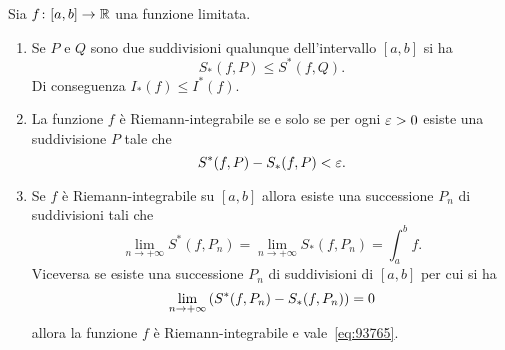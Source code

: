 \begin{theorem}
\label{th:criteri_integrabilita}
\mymark{*}
Sia $f\colon[a,b]\to \mathbb R$ una funzione limitata.
\begin{enumerate}
\item
Se $P$ e $Q$ sono due suddivisioni qualunque dell'intervallo
$[a,b]$ si ha
\[
  S_*(f,P) \le S^*(f,Q).
\]
Di conseguenza $I_*(f) \le I^*(f)$.

\item
La funzione $f$ è Riemann-integrabile se e solo se
per ogni $\varepsilon>0$ esiste una suddivisione $P$
tale che
\[
  S^*(f,P) - S_*(f,P) < \varepsilon.
\]

\item
Se $f$ è Riemann-integrabile su $[a,b]$ allora
esiste una successione $P_n$ di suddivisioni tali che
\begin{equation}\label{eq:93765}
  \lim_{n\to +\infty} S^*(f,P_n)
  = \lim_{n\to+\infty} S_*(f,P_n)
  = \int_a^b f.
\end{equation}
Viceversa se esiste una successione $P_n$ di suddivisioni di $[a,b]$
per cui si ha
\begin{equation*}
  \lim_{n\to +\infty} {\left( S^*(f,P_n) - S_*(f,P_n) \right)} = 0
\end{equation*}
allora la funzione $f$ è Riemann-integrabile e vale~\eqref{eq:93765}.
\end{enumerate}
\end{theorem}
%
